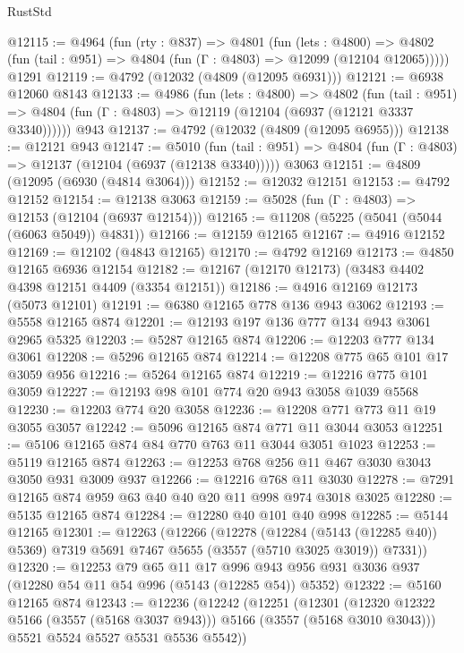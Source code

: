\begin{lexlean}{RustStd}
\begin{coremodule}
@12115 := @4964
    (fun (rty : @837) =>
    @4801
      (fun (lets : @4800) =>
      @4802 (fun (tail : @951) => @4804 (fun (Γ : @4803) => @12099 (@12104 @12065)))))
    @1291
@12119 := @4792 (@12032 (@4809 (@12095 @6931)))
@12121 := @6938 @12060 @8143
@12133 := @4986
    (fun (lets : @4800) =>
    @4802
      (fun (tail : @951) =>
      @4804 (fun (Γ : @4803) => @12119 (@12104 (@6937 (@12121 @3337 @3340))))))
    @943
@12137 := @4792 (@12032 (@4809 (@12095 @6955)))
@12138 := @12121 @943
@12147 := @5010
    (fun (tail : @951) => @4804 (fun (Γ : @4803) => @12137 (@12104 (@6937 (@12138 @3340)))))
    @3063
@12151 := @4809 (@12095 (@6930 (@4814 @3064)))
@12152 := @12032 @12151
@12153 := @4792 @12152
@12154 := @12138 @3063
@12159 := @5028 (fun (Γ : @4803) => @12153 (@12104 (@6937 @12154)))
@12165 := @11208 (@5225 (@5041 (@5044 (@6063 @5049)) @4831))
@12166 := @12159 @12165
@12167 := @4916 @12152
@12169 := @12102 (@4843 @12165)
@12170 := @4792 @12169
@12173 := @4850 @12165 @6936 @12154
@12182 := @12167 (@12170 @12173) (@3483 @4402 @4398 @12151 @4409 (@3354 @12151))
@12186 := @4916 @12169 @12173 (@5073 @12101)
@12191 := @6380 @12165 @778 @136 @943 @3062
@12193 := @5558 @12165 @874
@12201 := @12193 @197 @136 @777 @134 @943 @3061 @2965 @5325
@12203 := @5287 @12165 @874
@12206 := @12203 @777 @134 @3061
@12208 := @5296 @12165 @874
@12214 := @12208 @775 @65 @101 @17 @3059 @956
@12216 := @5264 @12165 @874
@12219 := @12216 @775 @101 @3059
@12227 := @12193 @98 @101 @774 @20 @943 @3058 @1039 @5568
@12230 := @12203 @774 @20 @3058
@12236 := @12208 @771 @773 @11 @19 @3055 @3057
@12242 := @5096 @12165 @874 @771 @11 @3044 @3053
@12251 := @5106 @12165 @874 @84 @770 @763 @11 @3044 @3051 @1023
@12253 := @5119 @12165 @874
@12263 := @12253 @768 @256 @11 @467 @3030 @3043 @3050 @931 @3009 @937
@12266 := @12216 @768 @11 @3030
@12278 := @7291 @12165 @874 @959 @63 @40 @40 @20 @11 @998 @974 @3018 @3025
@12280 := @5135 @12165 @874
@12284 := @12280 @40 @101 @40 @998
@12285 := @5144 @12165
@12301 := @12263
    (@12266
      (@12278
        (@12284 (@5143 (@12285 @40)) @5369)
        @7319
        @5691
        @7467
        @5655
        (@3557 (@5710 @3025 @3019))
        @7331))
@12320 := @12253
    @79
    @65
    @11
    @17
    @996
    @943
    @956
    @931
    @3036
    @937
    (@12280 @54 @11 @54 @996 (@5143 (@12285 @54)) @5352)
@12322 := @5160 @12165 @874
@12343 := @12236
    (@12242
      (@12251
        (@12301 (@12320 @12322 @5166 (@3557 (@5168 @3037 @943))) @5166 (@3557 (@5168 @3010 @3043)))
        @5521
        @5524
        @5527
        @5531
        @5536
        @5542))

\end{coremodule}
\end{lexlean}
